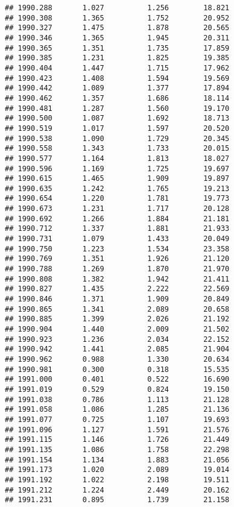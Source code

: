 \documentclass[]{book}
\begin{document}
\begin{verbatim}
## 1990.288       1.027          1.256        18.821
## 1990.308       1.365          1.752        20.952
## 1990.327       1.475          1.878        20.565
## 1990.346       1.365          1.945        20.311
## 1990.365       1.351          1.735        17.859
## 1990.385       1.231          1.825        19.385
## 1990.404       1.447          1.715        17.962
## 1990.423       1.408          1.594        19.569
## 1990.442       1.089          1.377        17.894
## 1990.462       1.357          1.686        18.114
## 1990.481       1.287          1.560        19.170
## 1990.500       1.087          1.692        18.713
## 1990.519       1.017          1.597        20.520
## 1990.538       1.090          1.729        20.345
## 1990.558       1.343          1.733        20.015
## 1990.577       1.164          1.813        18.027
## 1990.596       1.169          1.725        19.697
## 1990.615       1.465          1.909        19.897
## 1990.635       1.242          1.765        19.213
## 1990.654       1.220          1.781        19.773
## 1990.673       1.231          1.717        20.128
## 1990.692       1.266          1.884        21.181
## 1990.712       1.337          1.881        21.933
## 1990.731       1.079          1.433        20.049
## 1990.750       1.223          1.534        23.358
## 1990.769       1.351          1.926        21.120
## 1990.788       1.269          1.870        21.970
## 1990.808       1.382          1.942        21.411
## 1990.827       1.435          2.222        22.569
## 1990.846       1.371          1.909        20.849
## 1990.865       1.341          2.089        20.658
## 1990.885       1.399          2.026        21.192
## 1990.904       1.440          2.009        21.502
## 1990.923       1.236          2.034        22.152
## 1990.942       1.441          2.085        21.904
## 1990.962       0.988          1.330        20.634
## 1990.981       0.300          0.318        15.535
## 1991.000       0.401          0.522        16.690
## 1991.019       0.529          0.824        19.150
## 1991.038       0.786          1.113        21.128
## 1991.058       1.086          1.285        21.136
## 1991.077       0.725          1.107        19.693
## 1991.096       1.127          1.591        21.576
## 1991.115       1.146          1.726        21.449
## 1991.135       1.086          1.758        22.298
## 1991.154       1.134          1.883        21.056
## 1991.173       1.020          2.089        19.014
## 1991.192       1.022          2.198        19.511
## 1991.212       1.224          2.449        20.162
## 1991.231       0.895          1.739        21.158

\end{verbatim}
\end{document}
